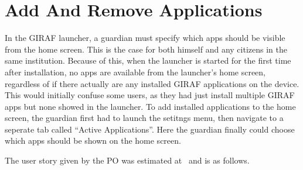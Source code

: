 \section{Add And Remove Applications}
\label{sec:add_and_remove_applications}
In the GIRAF launcher, a guardian must specify which apps should be visible from the home screen.
This is the case for both himself and any citizens in the same institution.
Because of this, when the launcher is started for the first time after installation, no apps are available from the launcher's home screen, regardless of if there actually are any installed GIRAF applications on the device.
This would initially confuse some users, as they had just install multiple GIRAF apps but none showed in the launcher.
To add installed applications to the home screen, the guardian first had to launch the setitngs menu, then navigate to a seperate tab called \enquote{Active Applications}.
Here the guardian finally could choose which apps should be shown on the home screen.

\bigskip
The user story given by the PO was estimated at \pmedhigh~and is as follows.


